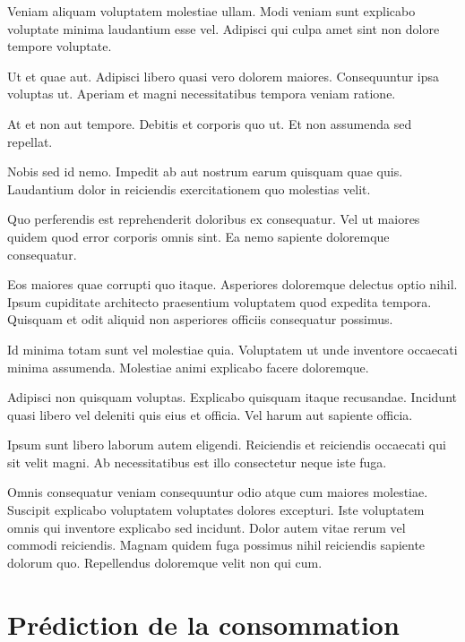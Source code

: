\documentclass[a4paper]{article}
\begin{document}
\begin{multicols}{2}
Veniam aliquam voluptatem molestiae ullam. Modi veniam sunt explicabo voluptate
minima laudantium esse vel. Adipisci qui culpa amet sint non dolore tempore
voluptate.

Ut et quae aut. Adipisci libero quasi vero dolorem maiores. Consequuntur ipsa
voluptas ut. Aperiam et magni necessitatibus tempora veniam ratione.

At et non aut tempore. Debitis et corporis quo ut. Et non assumenda sed
repellat.

Nobis sed id nemo. Impedit ab aut nostrum earum quisquam quae quis. Laudantium
dolor in reiciendis exercitationem quo molestias velit.

Quo perferendis est reprehenderit doloribus ex consequatur. Vel ut maiores
quidem quod error corporis omnis sint. Ea nemo sapiente doloremque consequatur.

Eos maiores quae corrupti quo itaque. Asperiores doloremque delectus optio
nihil. Ipsum cupiditate architecto praesentium voluptatem quod expedita tempora.
Quisquam et odit aliquid non asperiores officiis consequatur possimus.

Id minima totam sunt vel molestiae quia. Voluptatem ut unde inventore occaecati
minima assumenda. Molestiae animi explicabo facere doloremque.

Adipisci non quisquam voluptas. Explicabo quisquam itaque recusandae. Incidunt
quasi libero vel deleniti quis eius et officia. Vel harum aut sapiente officia.

Ipsum sunt libero laborum autem eligendi. Reiciendis et reiciendis occaecati qui
sit velit magni. Ab necessitatibus est illo consectetur neque iste fuga.

Omnis consequatur veniam consequuntur odio atque cum maiores molestiae. Suscipit
explicabo voluptatem voluptates dolores excepturi. Iste voluptatem omnis qui
inventore explicabo sed incidunt. Dolor autem vitae rerum vel commodi
reiciendis. Magnam quidem fuga possimus nihil reiciendis sapiente dolorum quo.
Repellendus doloremque velit non qui cum.

\end{multicols}

\clearpage
\section{Prédiction de la consommation}
\end{document}
